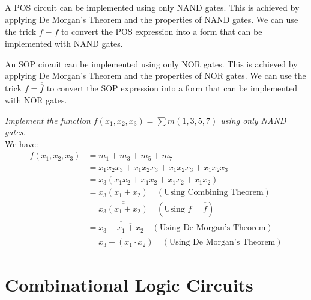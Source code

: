\documentclass[11pt]{report}
\begin{document}
\begin{theorem}
    A POS circuit can be implemented using only NAND gates. This is achieved by applying De Morgan's Theorem and the properties of NAND gates. We can use the trick $f = \overline{\overline{f}}$ to convert the POS expression into a form that can be implemented with NAND gates.
\end{theorem}
\begin{theorem}
    An SOP circuit can be implemented using only NOR gates. This is achieved by applying De Morgan's Theorem and the properties of NOR gates. We can use the trick $f = \overline{\overline{f}}$ to convert the SOP expression into a form that can be implemented with NOR gates.
\end{theorem}

\begin{example}
    \textit{Implement the function $f(x_1, x_2, x_3) = \sum m(1, 3, 5, 7)$ using only NAND gates.}
    \\
    We have:
    \begin{align*}
        f(x_1, x_2, x_3) &= m_1 + m_3 + m_5 + m_7 \\
        &= \overline{x_1}\overline{x_2}x_3 + \overline{x_1}x_2x_3 + x_1\overline{x_2}x_3 + x_1x_2x_3 \\
        &= x_3(\overline{x_1}\overline{x_2} + \overline{x_1}x_2 + x_1\overline{x_2} + x_1x_2) \\
        &= x_3(x_1 + x_2) \quad (\text{Using Combining Theorem}) \\
        &= \overline{\overline{x_3(x_1 + x_2)}} \quad (\text{Using } f = \overline{\overline{f}}) \\
        &= \overline{\overline{x_3} + \overline{x_1 + x_2}} \quad (\text{Using De Morgan's Theorem}) \\
        &= \overline{\overline{x_3} + (\overline{x_1} \cdot \overline{x_2})} \quad (\text{Using De Morgan's Theorem}) 
    \end{align*}    
\end{example}

\section{Combinational Logic Circuits}
\end{document}
